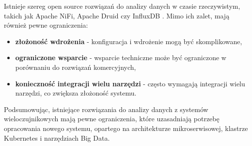 Istnieje szereg open source rozwiązań do analizy danych w czasie rzeczywistym, takich jak Apache NiFi,
Apache Druid czy InfluxDB . Mimo ich zalet, mają również pewne ograniczenia:

\begin{itemize}
    \item \textbf{złożoność wdrożenia} - konfiguracja i wdrożenie mogą być skomplikowane,
    \item \textbf{ograniczone wsparcie} - wsparcie techniczne może być ograniczone w porównaniu do rozwiązań komercyjnych,
    \item \textbf{konieczność integracji wielu narzędzi} - często wymagają integracji wielu narzędzi, co zwiększa złożoność systemu.
\end{itemize}

Podsumowując, istniejące rozwiązania do analizy danych z systemów wieloczujnikowych mają pewne ograniczenia,
które uzasadniają potrzebę opracowania nowego systemu, opartego na architekturze mikroserwisowej, klastrze Kubernetes i narzędziach Big Data.